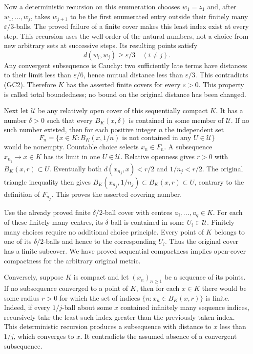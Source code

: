 \documentclass[
  11pt,
]{article}
\begin{document}
Now a deterministic recursion on this enumeration chooses \(w_1=z_1\)
and, after \(w_1,\ldots,w_j\), takes \(w_{j+1}\) to be the first
enumerated entry outside their finitely many \(\varepsilon/3\)-balls.
The proved failure of a finite cover makes this least index exist at
every step. This recursion uses the well-order of the natural numbers,
not a choice from new arbitrary sets at successive steps. Its resulting
points satisfy \[
 d(w_i,w_j)\geq\varepsilon/3\quad(i\ne j).
 \tag{GC2}
\] Any convergent subsequence is Cauchy: two sufficiently late terms
have distances to their limit less than \(\varepsilon/6\), hence mutual
distance less than \(\varepsilon/3\). This contradicts (GC2). Therefore
\(K\) has the asserted finite covers for every \(\varepsilon>0\). This
property is called total boundedness; no bound on the original distance
has been changed.

Next let \(\mathcal U\) be any relatively open cover of this
sequentially compact \(K\). It has a number \(\delta>0\) such that every
\(B_K(x,\delta)\) is contained in some member of \(\mathcal U\). If no
such number existed, then for each positive integer \(n\) the
independent set \[
 F_n=\{x\in K:B_K(x,1/n)
               \text{ is not contained in any }U\in\mathcal U\}
 \tag{GC3}
\] would be nonempty. Countable choice selects \(x_n\in F_n\). A
subsequence \(x_{n_j}\to x\in K\) has its limit in one
\(U\in\mathcal U\). Relative openness gives \(r>0\) with
\(B_K(x,r)\subset U\). Eventually both \(d(x_{n_j},x)<r/2\) and
\(1/n_j<r/2\). The original triangle inequality then gives
\(B_K(x_{n_j},1/n_j)\subset B_K(x,r)\subset U\), contrary to the
definition of \(F_{n_j}\). This proves the asserted covering number.

Use the already proved finite \(\delta/2\)-ball cover with centres
\(a_1,\ldots,a_q\in K\). For each of these finitely many centres, its
\(\delta\)-ball is contained in some \(U_i\in\mathcal U\). Finitely many
choices require no additional choice principle. Every point of \(K\)
belongs to one of its \(\delta/2\)-balls and hence to the corresponding
\(U_i\). Thus the original cover has a finite subcover. We have proved
sequential compactness implies open-cover compactness for the arbitrary
original metric.

Conversely, suppose \(K\) is compact and let \((x_n)_{n\geq1}\) be a
sequence of its points. If no subsequence converged to a point of \(K\),
then for each \(x\in K\) there would be some radius \(r>0\) for which
the set of indices \(\{n:x_n\in B_K(x,r)\}\) is finite. Indeed, if every
\(1/j\)-ball about some \(x\) contained infinitely many sequence
indices, recursively take the least such index greater than the
previously taken index. This deterministic recursion produces a
subsequence with distance to \(x\) less than \(1/j\), which converges to
\(x\). It contradicts the assumed absence of a convergent subsequence.
\end{document}
